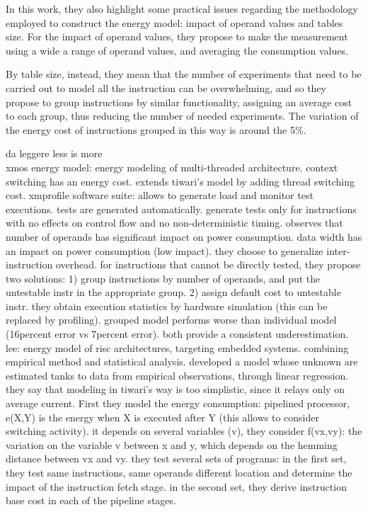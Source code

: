 In this work, they also highlight some practical issues regarding the methodology employed to construct the energy model: impact of operand values and tables size. For the impact of operand values, they propose to make the measurement using a wide a range of operand values, and averaging the consumption values. \par 
By table size, instead, they mean that the number of experiments that need to be carried out to model all the instruction can be overwhelming, and so they propose to group instructions by similar functionality, assigning an average cost to each group, thus reducing the number of needed experiments. The variation of the energy cost of instructions grouped in this way is around the 5\%. 


da leggere less is more\\
xmos energy model: energy modeling of multi-threaded architecture. context switching has an energy cost. extends tiwari's model by adding thread switching cost. xmprofile software suite: allows to generate load and monitor test executions. tests are generated automatically. generate tests only for instructions with no effects on control flow and no non-deterministic timing.
observes that number of operands has significant impact on power consumption. data width has an impact on power consumption (low impact). they choose to generalize inter-instruction overhead. 
for instructions that cannot be directly tested, they propose two solutions: 1) group instructions by number of operands, and put the untestable instr in the appropriate group. 2) assign default cost to untestable instr. 
they obtain execution statistics by hardware simulation (this can be replaced by profiling).
grouped model performs worse than individual model (16percent error vs 7percent error). both provide a consistent underestimation. \\[1in]


lee: energy model of risc architectures, targeting embedded systems. combining empirical method and statistical analysis.
developed a model whose unknown are estimated tanks to data from empirical observations, through linear regression. they say that modeling in tiwari's way is too simplistic, since it relays only on average current.  
First they model the energy consumption: pipelined processor, e(X,Y) is the energy when X is executed after Y (this allows to consider switching activity). it depends on several variables (v), they consider f(vx,vy): the variation on the variable v between x and y, which depends on the hemming distance between vx and vy. 
they test several sets of programs: in the first set, they test same instructions, same operands different location and determine the impact of the instruction fetch stage. in the second set, they derive instruction base cost in each of the pipeline stages. \\[1in]


